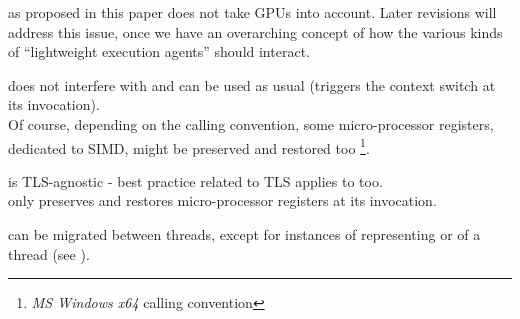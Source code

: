 \newpage
{}


\cc as proposed in this paper does not take GPUs into account. Later revisions
will address this issue, once we have an overarching concept of how the various
kinds of ``lightweight execution agents'' should interact.



does not interfere with \cc and can be used as usual (\cc triggers the context
switch at its invocation).\\

Of course, depending on the calling convention, some micro-processor registers,
dedicated to SIMD, might be preserved and restored too
\footnote{\emph{MS Windows x64} calling convention}.



\cc is TLS-agnostic - best practice related to TLS applies to \cc too.\\

\cc only preserves and restores micro-processor registers at its invocation.



\cont can be migrated between threads, except for instances of
\cont representing \main or \entryfn of a thread (see ).
